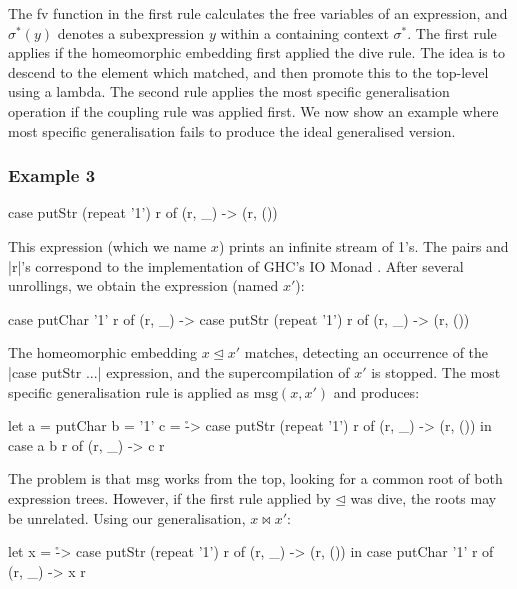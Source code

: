 The fv function in the first rule calculates the free variables of an expression, and $\sigma^*(y)$ denotes a subexpression $y$ within a containing context $\sigma^*$. The first rule applies if the homeomorphic embedding first applied the dive rule. The idea is to descend to the element which matched, and then promote this to the top-level using a lambda. The second rule applies the most specific generalisation operation if the coupling rule was applied first. We now show an example where most specific generalisation fails to produce the ideal generalised version.

\subsubsection{Example 3}\hfill

\begin{code}
case  putStr (repeat '1') r of
      (r, _) -> (r, ())
\end{code}

This expression (which we name $x$) prints an infinite stream of 1's. The pairs and |r|'s correspond to the implementation of GHC's IO Monad \cite{spj:awkward_squad}. After several unrollings, we obtain the expression (named $x'$):

\begin{code}
case  putChar '1' r of
      (r, _) -> case  putStr (repeat '1') r of
                      (r, _) -> (r, ())
\end{code}

The homeomorphic embedding $x \unlhd x'$ matches, detecting an occurrence of the |case putStr \? ...| expression, and the supercompilation of $x'$ is stopped. The most specific generalisation rule is applied as $\text{msg}(x,x')$ and produces:

\begin{code}
let  a = putChar
     b = '1'
     c = \r -> case  putStr (repeat '1') r of
                     (r, _) -> (r, ())
in case  a b r of
         (r, _) -> c r
\end{code}

The problem is that msg works from the top, looking for a common root of both expression trees. However, if the first rule applied by $\unlhd$ was dive, the roots may be unrelated. Using our generalisation, $x \bowtie x'$:

\begin{code}
let x = \r -> case  putStr (repeat '1') r of
                    (r, _) -> (r, ())
in case  putChar '1' r of
         (r, _) -> x r
\end{code}

